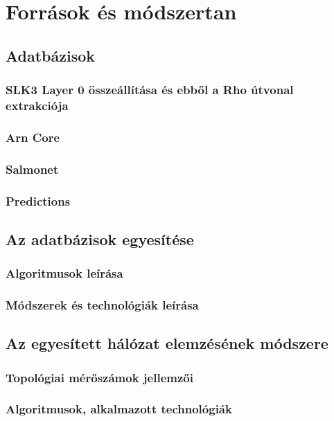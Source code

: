 \documentclass[a4paper,12pt]{article}
\begin{document}
\section{Források és módszertan}

	\subsection{Adatbázisok}
		\subsubsection{SLK3 Layer 0 összeállítása és ebből a Rho útvonal extrakciója}
		\subsubsection{Arn Core}
		\subsubsection{Salmonet}
		\subsubsection{Predictions}

	\subsection{Az adatbázisok egyesítése}
		\subsubsection{Algoritmusok leírása}
		\subsubsection{Módszerek és technológiák leírása}

	\subsection{Az egyesített hálózat elemzésének módszere}
		\subsubsection{Topológiai mérőszámok jellemzői}
		\subsubsection{Algoritmusok, alkalmazott technológiák}
\end{document}

